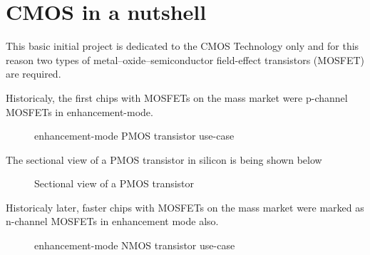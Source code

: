 \section{CMOS in a nutshell}
This basic initial project is dedicated to the CMOS Technology only and for this reason two types of metal–oxide–semiconductor field-effect transistors (MOSFET) are required.

Historicaly, the first chips with MOSFETs on the mass market were p-channel MOSFETs in enhancement-mode.

\begin{figure}[H]
	\centering
	\begin{circuitdiagram}{20}{20}
	\end{circuitdiagram}
	\caption{enhancement-mode PMOS transistor use-case}
\end{figure}

The sectional view of a PMOS transistor in silicon is being shown below
\begin{figure}[H]
	\centering
	\begin{tikzpicture}[node distance = 3cm, auto, thick,scale=0.5, every node/.style={transform shape}]
		
	\end{tikzpicture}
	\caption{Sectional view of a PMOS transistor}
\end{figure}

Historicaly later, faster chips with MOSFETs on the mass market were marked as n-channel MOSFETs in enhancement mode also.

\begin{figure}[H]
	\centering
	\begin{circuitdiagram}{20}{20}
	\end{circuitdiagram}
	\caption{enhancement-mode NMOS transistor use-case}
\end{figure}

